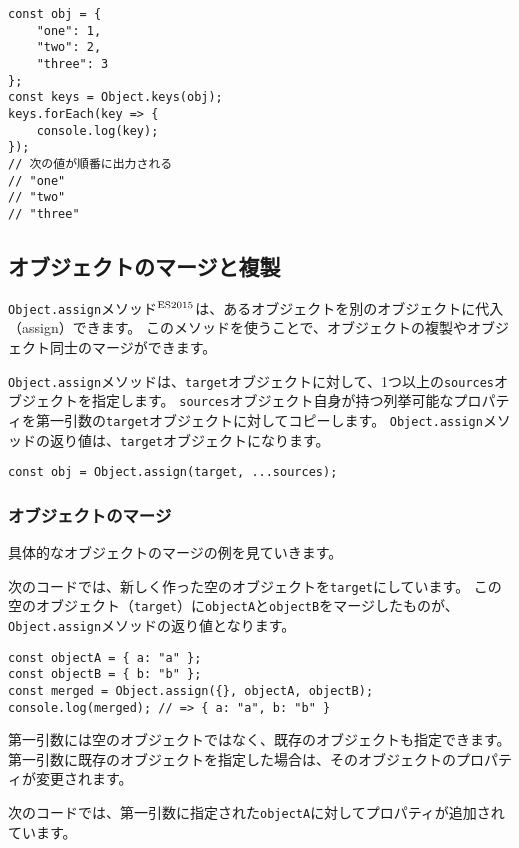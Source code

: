 \begin{lstlisting}
const obj = {
    "one": 1,
    "two": 2,
    "three": 3
};
const keys = Object.keys(obj);
keys.forEach(key => {
    console.log(key);
});
// 次の値が順番に出力される
// "one"
// "two"
// "three"
\end{lstlisting}

\hypertarget{copy-and-merge}{%
\subsection{オブジェクトのマージと複製}\label{copy-and-merge}}

\texttt{Object.assign}メソッド{$^{\rm ES2015}$}は、あるオブジェクトを別のオブジェクトに代入（assign）できます。
このメソッドを使うことで、オブジェクトの複製やオブジェクト同士のマージができます。

\texttt{Object.assign}メソッドは、\texttt{target}オブジェクトに対して、1つ以上の\texttt{sources}オブジェクトを指定します。
\texttt{sources}オブジェクト自身が持つ列挙可能なプロパティを第一引数の\texttt{target}オブジェクトに対してコピーします。
\texttt{Object.assign}メソッドの返り値は、\texttt{target}オブジェクトになります。

\begin{lstlisting}
const obj = Object.assign(target, ...sources);
\end{lstlisting}

\hypertarget{merge}{%
\subsubsection{オブジェクトのマージ}\label{merge}}

具体的なオブジェクトのマージの例を見ていきます。

次のコードでは、新しく作った空のオブジェクトを\texttt{target}にしています。
この空のオブジェクト（\texttt{target}）に\texttt{objectA}と\texttt{objectB}をマージしたものが、\texttt{Object.assign}メソッドの返り値となります。

\begin{lstlisting}
const objectA = { a: "a" };
const objectB = { b: "b" };
const merged = Object.assign({}, objectA, objectB);
console.log(merged); // => { a: "a", b: "b" }
\end{lstlisting}

第一引数には空のオブジェクトではなく、既存のオブジェクトも指定できます。
第一引数に既存のオブジェクトを指定した場合は、そのオブジェクトのプロパティが変更されます。

次のコードでは、第一引数に指定された\texttt{objectA}に対してプロパティが追加されています。

